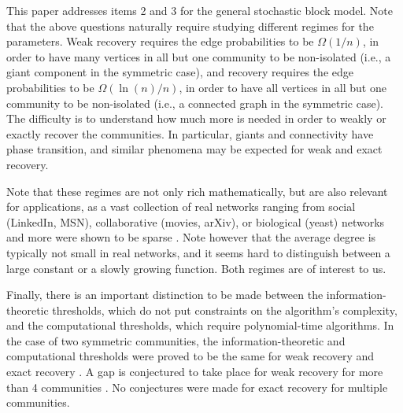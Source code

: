 \documentclass[11pt]{article}
\newcommand{\1}{\mathbb{1}}
\begin{document}
This paper addresses items 2 and 3 for the general stochastic block model. 
Note that the above questions naturally require studying different regimes for the parameters. Weak recovery requires the edge probabilities to be $\Omega(1/n)$, in order to have many vertices in all but one community to be non-isolated  (i.e., a giant component in the symmetric case), and recovery requires the edge probabilities to be $\Omega(\ln(n)/n)$, in order to have all vertices in all but one community to be non-isolated (i.e., a connected graph in the symmetric case). The difficulty is to understand how much more is needed in order to weakly or exactly recover the communities. In particular, giants and connectivity have phase transition, and similar phenomena may be expected for weak and exact recovery. 

Note that these regimes are not only rich mathematically, but are also relevant for applications, as a vast collection of real networks ranging from social (LinkedIn, MSN), collaborative (movies, arXiv), or biological (yeast) networks and more were shown to be sparse \cite{sparse-network1,sparse-network2}. Note however that the average degree is typically not small in real networks, and it seems hard to distinguish between a large constant or a slowly growing function. Both regimes are of interest to us.  



Finally, there is an important distinction to be made between the information-theoretic thresholds, which do not put constraints on the algorithm's complexity, and the computational thresholds, which require polynomial-time algorithms. In the case of two symmetric communities, the information-theoretic and computational thresholds were proved to be the same for weak recovery \cite{massoulie-STOC,Mossel_SBM2} and exact recovery \cite{abh,mossel-consist}. A gap is conjectured to take place for weak recovery for more than 4 communities \cite{mossel-sbm}. No conjectures were made for exact recovery for multiple communities.  
\end{document}

